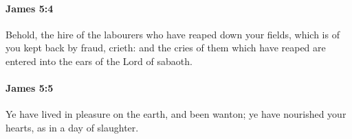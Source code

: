 		\paragraph{James 5:4} %
			\label{JAMES-5-4}

			Behold, the hire of the labourers who have reaped down your fields, which is of you kept back by fraud, crieth: and the cries of them which have reaped are entered into the ears of the Lord of sabaoth.

			\begin{framed}
			\scriptsize
				\begin{compactdesc}
					\item[SBLG] 
				\end{compactdesc}
			\end{framed}

		\paragraph{James 5:5} %
			\label{JAMES-5-5}

			Ye have lived in pleasure on the earth, and been wanton; ye have nourished your hearts, as in a day of slaughter.

